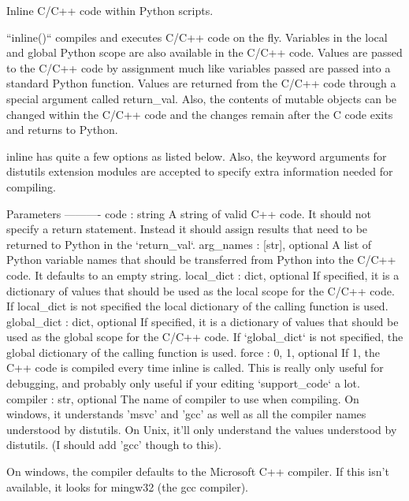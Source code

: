 \begin{DoxyVerb}Inline C/C++ code within Python scripts.

``inline()`` compiles and executes C/C++ code on the fly.  Variables
in the local and global Python scope are also available in the
C/C++ code.  Values are passed to the C/C++ code by assignment
much like variables passed are passed into a standard Python
function.  Values are returned from the C/C++ code through a
special argument called return_val.  Also, the contents of
mutable objects can be changed within the C/C++ code and the
changes remain after the C code exits and returns to Python.

inline has quite a few options as listed below.  Also, the keyword
arguments for distutils extension modules are accepted to
specify extra information needed for compiling.

Parameters
----------
code : string
    A string of valid C++ code.  It should not specify a return
    statement.  Instead it should assign results that need to be
    returned to Python in the `return_val`.
arg_names : [str], optional
    A list of Python variable names that should be transferred from
    Python into the C/C++ code.  It defaults to an empty string.
local_dict : dict, optional
    If specified, it is a dictionary of values that should be used as
    the local scope for the C/C++ code.  If local_dict is not
    specified the local dictionary of the calling function is used.
global_dict : dict, optional
    If specified, it is a dictionary of values that should be used as
    the global scope for the C/C++ code.  If `global_dict` is not
    specified, the global dictionary of the calling function is used.
force : {0, 1}, optional
    If 1, the C++ code is compiled every time inline is called.  This
    is really only useful for debugging, and probably only useful if
    your editing `support_code` a lot.
compiler : str, optional
    The name of compiler to use when compiling.  On windows, it
    understands 'msvc' and 'gcc' as well as all the compiler names
    understood by distutils.  On Unix, it'll only understand the
    values understood by distutils. (I should add 'gcc' though to
    this).

    On windows, the compiler defaults to the Microsoft C++ compiler.
    If this isn't available, it looks for mingw32 (the gcc compiler).


\end{DoxyVerb}
